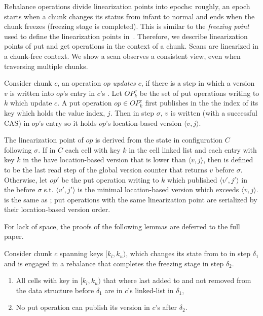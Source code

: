 Rebalance operations divide linearization points into epochs: roughly, an epoch starts when a chunk changes its status from infant to normal and ends when the chunk freezes (freezing stage is completed). This is similar to the \emph{freezing point} used to define the linearization points in~\cite{BraginskyP2012}. Therefore, we describe linearization points of put and get operations in the context of a chunk. Scans are linearized in a chunk-free context. We show a scan observes a consistent view, even when traversing multiple chunks.

Consider chunk $c$, an operation $op$ \emph{updates $c$}, if there is a step in which a version $v$ is written into $op$'s entry in $c$'s . 
Let $OP_k^c$ be the set of put operations writing to $k$ which update $c$. 
A put operation $op \in OP_k^c$ first publishes in the  the index of its key which holds the value index, $j$. 
Then in step $\sigma$, $v$ is written (with a successful CAS) in $op$'s entry so it holds $op$'s location-based version $\langle v, j\rangle$. 

The linearization point of $op$ is derived from the state in configuration $C$ following $\sigma$. If in $C$ each cell with key $k$ in the cell linked list and each entry with key $k$ in the  have location-based version that is lower than $\langle v, j\rangle$, then  is defined to be the last read step of the global version counter that returns $v$ before $\sigma$. Otherwise, let $op'$ be the put operation writing to $k$ which published $\langle v', j'\rangle$ in the  before $\sigma$ s.t. $\langle v', j'\rangle$ is the minimal location-based version which exceeds $\langle v, j\rangle$.  is the same as ; put operations with the same linearization point are serialized by their location-based version order.

For lack of space, the proofs of the following lemmas are deferred to the full paper.%

\begin{lemma}
\label{proof:rebalance}
Consider chunk $c$ spanning keys $[k_l,k_u)$, which changes its state from  to  in step $\delta_1$ and is engaged in a rebalance that completes the freezing stage in step $\delta_2$.
\begin{enumerate}
\setlength{\itemsep}{0pt}
\setlength{\parskip}{0pt}
\item \label{proof:rebalance:infant} All cells with key in $[k_l,k_u)$ that where last added to and not removed from the data structure before $\delta_1$ are in $c$'s linked-list in $\delta_1$,
\item \label{proof:rebalance:freezing} No put operation can publish its version in $c$'s  after $\delta_2$.
\end{enumerate}
\end{lemma}

